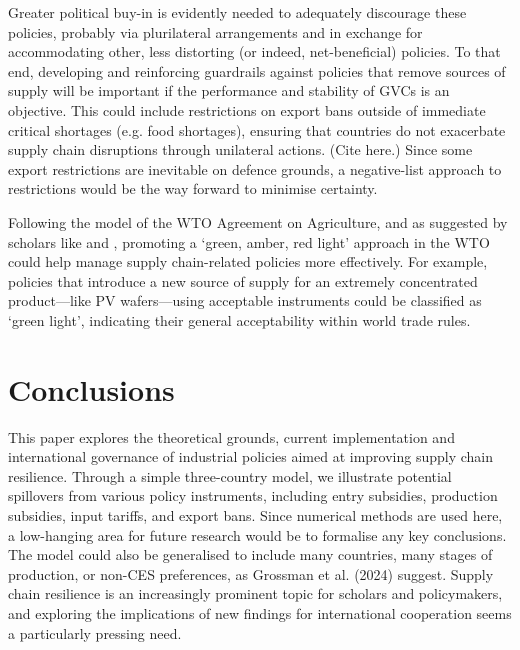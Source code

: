 \documentclass{article}
\begin{document}
Greater political buy-in is evidently needed to adequately discourage these policies, probably via plurilateral arrangements and in exchange for accommodating other, less distorting (or indeed, net-beneficial) policies. To that end, developing and reinforcing guardrails against policies that remove sources of supply will be important if the performance and stability of GVCs is an objective. This could include restrictions on export bans outside of immediate critical shortages (e.g. food shortages), ensuring that countries do not exacerbate supply chain disruptions through unilateral actions. (Cite \textcite{bown_how_2023} here.) Since some export restrictions are inevitable on defence grounds, a negative-list approach to restrictions would be the way forward to minimise certainty.

Following the model of the WTO Agreement on Agriculture, and as suggested by scholars like \textcite{aguayo_ayala_preserving_2005} and \textcite{bown_wtoing_2019}, promoting a `green, amber, red light' approach in the WTO could help manage supply chain-related policies more effectively. For example, policies that introduce a new source of supply for an extremely concentrated product---like PV wafers---using acceptable instruments could be classified as `green light', indicating their general acceptability within world trade rules.

\section{Conclusions}

This paper explores the theoretical grounds, current implementation and international governance of industrial policies aimed at improving supply chain resilience. Through a simple three-country model, we illustrate potential spillovers from various policy instruments, including entry subsidies, production subsidies, input tariffs, and export bans. Since numerical methods are used here, a low-hanging area for future research would be to formalise any key conclusions. The model could also be generalised to include many countries, many stages of production, or non-CES preferences, as Grossman et al. (2024) suggest. Supply chain resilience is an increasingly prominent topic for scholars and policymakers, and exploring the implications of new findings for international cooperation seems a particularly pressing need.

\printbibliography
\end{document}
